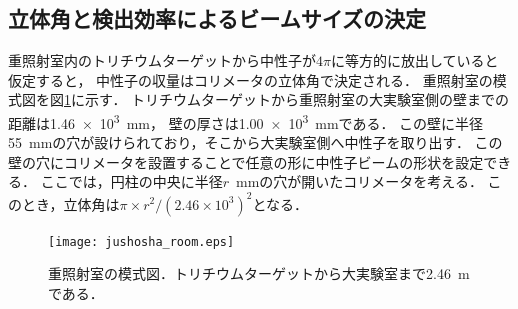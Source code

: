 \documentclass[../master]{subfiles}
\begin{document}
\subsection{立体角と検出効率によるビームサイズの決定}
重照射室内のトリチウムターゲットから中性子が$4\pi$に等方的に放出していると仮定すると，
中性子の収量はコリメータの立体角で決定される．
重照射室の模式図を図\ref{fig::jushosha_room}に示す．
トリチウムターゲットから重照射室の大実験室側の壁までの距離は\SI{1.46e3}{\milli\metre}，
壁の厚さは\SI{1.00e3}{\milli\metre}である．
この壁に半径\SI{55}{\milli\metre}の穴が設けられており，そこから大実験室側へ中性子を取り出す．
この壁の穴にコリメータを設置することで任意の形に中性子ビームの形状を設定できる．
ここでは，円柱の中央に半径$r$~\si{\milli\metre}の穴が開いたコリメータを考える．
このとき，立体角は$\pi\times r^2/\left(2.46\times10^3\right)^2$となる．
\begin{figure}
  \centering
  \texttt{[image: jushosha\_room.eps]}
  \caption{重照射室の模式図．トリチウムターゲットから大実験室まで\SI{2.46}{\metre}である．}
  \label{fig::jushosha_room}
\end{figure}
\end{document}
